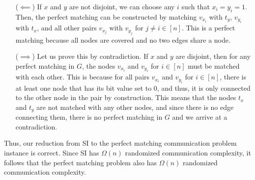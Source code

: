 \documentclass{article}
\begin{document}
\begin{itemize}
    \item[($\impliedby$)] If $x$ and $y$ are not disjoint, we can choose any $i$ such that $x_i = y_i = 1$. Then, the perfect matching can be constructed by matching $v_{x_i}$ with $t_y$, $v_{y_i}$ with $t_x$, and all other pairs $v_{x_j}$ with $v_{y_j}$ for $j \neq i \in [n]$. This is a perfect matching because all nodes are covered and no two edges share a node.
    \item[($\implies$)] Let us prove this by contradiction. If $x$ and $y$ are disjoint, then for any perfect matching in $G$, the nodes $v_{x_i}$ and $v_{y_i}$ for $i \in [n]$ must be matched with each other. This is because for all pairs $v_{x_i}$ and $v_{y_i}$ for $i \in [n]$, there is at least one node that has its bit value set to $0$, and thus, it is only connected to the other node in the pair by construction. This means that the nodes $t_x$ and $t_y$ are not matched with any other nodes, and since there is no edge connecting them, there is no perfect matching in $G$ and we arrive at a contradiction.
\end{itemize}

Thus, our reduction from SI to the perfect matching communication problem instance is correct. Since SI has $\Omega(n)$ randomized communication complexity, it follows that the perfect matching problem also has $\Omega(n)$ randomized communication complexity.
\end{document}
